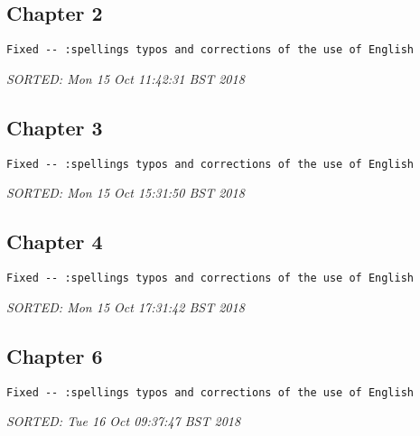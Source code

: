 \documentclass[10pt]{article}
\begin{document}
\subsection*{Chapter 2}

\begin{verbatim}
Fixed -- :spellings typos and corrections of the use of English
\end{verbatim}
\textit{
SORTED: 
Mon 15 Oct 11:42:31 BST 2018
}
\\


\subsection*{Chapter 3}

\begin{verbatim}
Fixed -- :spellings typos and corrections of the use of English
\end{verbatim}
\textit{
SORTED: 
Mon 15 Oct 15:31:50 BST 2018
}
\\



\subsection*{Chapter 4}

\begin{verbatim}
Fixed -- :spellings typos and corrections of the use of English
\end{verbatim}
\textit{
SORTED: 
Mon 15 Oct 17:31:42 BST 2018
}
\\


\subsection*{Chapter 6}

\begin{verbatim}
Fixed -- :spellings typos and corrections of the use of English
\end{verbatim}
\textit{
SORTED: 
Tue 16 Oct 09:37:47 BST 2018
}
\\
\end{document}
